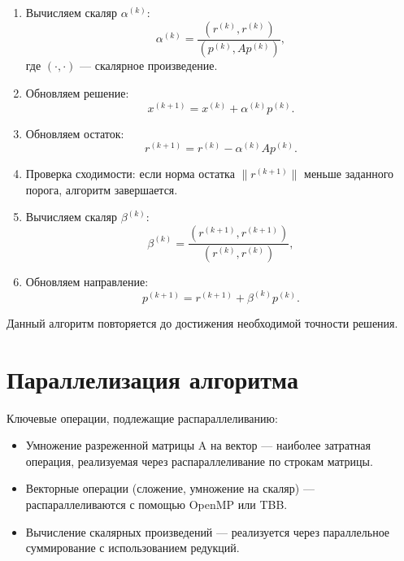 \documentclass[12pt]{article}
\begin{document}
\begin{enumerate}
    \item Вычисляем скаляр $\alpha^{(k)}$:
    \begin{equation}
    \alpha^{(k)} = \frac{\left( r^{(k)}, r^{(k)} \right)}{\left( p^{(k)}, A p^{(k)} \right)},
    \end{equation}
    где $(\cdot,\cdot)$ — скалярное произведение.
    
    \item Обновляем решение:
    \begin{equation}
    x^{(k+1)} = x^{(k)} + \alpha^{(k)} p^{(k)}.
    \end{equation}
    
    \item Обновляем остаток:
    \begin{equation}
    r^{(k+1)} = r^{(k)} - \alpha^{(k)} A p^{(k)}.
    \end{equation}
    
    \item Проверка сходимости: если норма остатка $\| r^{(k+1)} \|$ меньше заданного порога, алгоритм завершается.
    
    \item Вычисляем скаляр $\beta^{(k)}$:
    \begin{equation}
    \beta^{(k)} = \frac{\left( r^{(k+1)}, r^{(k+1)} \right)}{\left( r^{(k)}, r^{(k)} \right)},
    \end{equation}
    
    \item Обновляем направление:
    \begin{equation}
    p^{(k+1)} = r^{(k+1)} + \beta^{(k)} p^{(k)}.
    \end{equation}
\end{enumerate}

Данный алгоритм повторяется до достижения необходимой точности решения.

\section*{Параллелизация алгоритма}
Ключевые операции, подлежащие распараллеливанию:
\begin{itemize}
\item Умножение разреженной матрицы A на вектор — наиболее затратная операция, реализуемая через распараллеливание по строкам матрицы.
\item Векторные операции (сложение, умножение на скаляр) — распараллеливаются с помощью OpenMP или TBB.
\item Вычисление скалярных произведений — реализуется через параллельное суммирование с использованием редукций.
\end{itemize}
\end{document}

